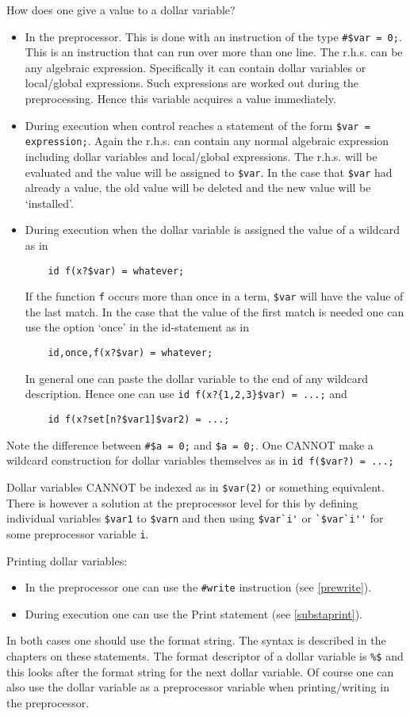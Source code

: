 How does one give a value to a dollar variable?
\begin{itemize}
\item In the preprocessor. This is done with an instruction of the type 
\verb:#$var = 0;:. This is an instruction that can run over more than one 
line. The r.h.s. can be any algebraic expression. Specifically it can 
contain dollar variables or local/global expressions. Such 
expressions are worked out during the preprocessing. Hence this variable 
acquires a value immediately.
\item During execution when control reaches a statement of the form 
\verb:$var = expression;:. Again the r.h.s. can contain any normal 
algebraic expression including dollar variables and local/global 
expressions. The r.h.s. will be evaluated and the value will be assigned to 
\verb:$var:. In the case that \verb:$var: had already a value, the old 
value will be deleted and the new value will be `installed'.
\item During execution when the dollar variable is assigned the value of a 
wildcard as in
\begin{verbatim}
    id f(x?$var) = whatever;
\end{verbatim}
If the function \verb:f: 
occurs more than once in a term, \verb:$var: will have the value of the 
last match. In the case that the value of the first match is needed one can 
use the option `once' in the id-statement as in
\begin{verbatim}
    id,once,f(x?$var) = whatever;
\end{verbatim}
In general one can paste the dollar variable to the end of any 
wildcard description. Hence one can use \verb:id f(x?{1,2,3}$var) = ...;: 
and
\begin{verbatim}
    id f(x?set[n?$var1]$var2) = ...;
\end{verbatim}
\end{itemize}
Note the difference between \verb:#$a = 0;: and \verb:$a = 0;:. One CANNOT 
make a wildcard construction for dollar variables 
themselves as in \verb:id f($var?) = ...;:

Dollar variables CANNOT be indexed as in \verb:$var(2): or something 
equivalent. There is however a solution at the preprocessor level for this 
by defining individual variables \verb:$var1: to \verb:$varn: and then 
using \verb:$var`i': or \verb:`$var`i'': for some preprocessor variable 
\verb:i:.

Printing dollar variables:
\begin{itemize}
\item In the preprocessor one can use the \verb:#write: instruction
        (see \ref{prewrite}).
\item During execution one can use the Print statement (see 
        \ref{substaprint}).
\end{itemize}
In both cases one should use the format string. The syntax is 
described in the chapters on these statements. The format descriptor of a 
dollar variable is \verb:%$: and this looks after the format string for the 
next dollar variable. Of course one can also use the dollar variable as a 
preprocessor variable when printing/writing in the preprocessor.

